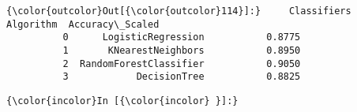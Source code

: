 \documentclass[11pt]{article}
\begin{document}
\begin{Verbatim}[commandchars=\\\{\}]
{\color{outcolor}Out[{\color{outcolor}114}]:}     Classifiers Algorithm  Accuracy\_Scaled
          0      LogisticRegression           0.8775
          1       KNearestNeighbors           0.8950
          2  RandomForestClassifier           0.9050
          3            DecisionTree           0.8825
\end{Verbatim}
            
    \begin{Verbatim}[commandchars=\\\{\}]
{\color{incolor}In [{\color{incolor} }]:}     
\end{Verbatim}



    
    
    
    
\end{document}
